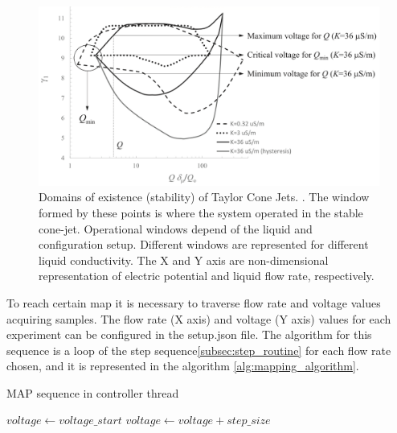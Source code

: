 \begin{figure}[H]
    \center
    \includegraphics[width=13cm]{Figuras/ganan_calvo_map.png}
    \caption{Domains of existence (stability) of Taylor Cone Jets. \cite{gananCalvo} . The window formed by these points is where the system operated in the stable cone-jet. Operational windows depend of the liquid and configuration setup. Different windows are represented for different liquid conductivity. The X and Y axis are non-dimensional representation of electric potential and liquid flow rate, respectively.}
    \label{fig:ganan_calvo_fig}
\end{figure}

To reach certain map it is necessary to traverse flow rate and voltage values acquiring samples.
The flow rate (X axis) and voltage (Y axis) values for each experiment can be configured in the setup.json file.
The algorithm for this sequence is a loop of the step sequence\ref{subsec:step_routine} for each flow rate chosen, and it is represented in the algorithm \ref{alg:mapping_algorithm}.


    \begin{algorithm}
        \caption{MAP sequence in controller thread}\label{alg:mapping_algorithm}
        \begin{algorithmic}
              
                \State {}
                \State $voltage \gets voltage\_start$
                 
                    \State {}
                    \State {}
                    \State $voltage \gets voltage + step\_size$
                \EndWhile
            \EndFor
        \EndProcedure

        \end{algorithmic}
    \end{algorithm}

